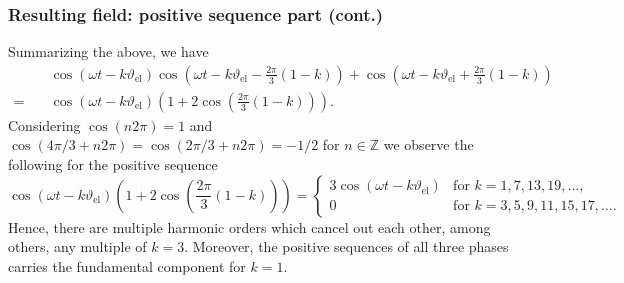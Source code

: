 \begin{frame}
	\frametitle{Resulting field: positive sequence part (cont.)}
    Summarizing the above, we have
        \begin{align*}
        &\cos(\omega t - k \vartheta_\mathrm{el})  \cos(\omega t - k \vartheta_\mathrm{el} - \frac{2\pi}{3}(1-k)) + \cos(\omega t - k \vartheta_\mathrm{el} + \frac{2\pi}{3}(1-k))\\
         = \quad &\cos(\omega t - k \vartheta_\mathrm{el})(1+2\cos(\frac{2\pi}{3}(1-k))).
    \end{align*}
    Considering $\cos(n 2 \pi)=1$ and $\cos(4\pi/3 + n 2 \pi) = \cos(2\pi/3 + n 2 \pi)=-1/2$ for $n \in \mathbb{Z}$ we observe the following for the positive sequence
    \begin{equation}
        \cos(\omega t - k \vartheta_\mathrm{el})(1+2\cos(\frac{2\pi}{3}(1-k))) = \begin{cases}
            3 \cos(\omega t - k \vartheta_\mathrm{el}) & \text{for } k=1,7,13,19,\ldots, \\
            0 & \text{for } k=3,5,9,11,15, 17,\ldots.
        \end{cases}
    \end{equation}
    Hence, there are multiple harmonic orders which cancel out each other, among others, any multiple of $k=3$. Moreover, the positive sequences of all three phases carries the fundamental component for $k=1$.    
\end{frame}

